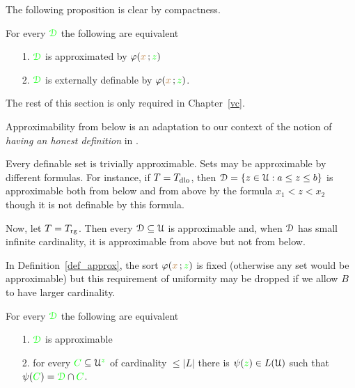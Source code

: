 The following proposition is clear by compactness.

\begin{proposition}\label{prop_approx=external}
   For every ${\color{green}\EuScript D}$ the following are equivalent
   \begin{itemize}
   \item[1.] ${\color{green}\EuScript D}$ is approximated by $\varphi({\color{brown} x}\,;{\color{green} z})$
   \item[2.] ${\color{green}\EuScript D}$ is externally definable by $\varphi({\color{brown} x}\,;{\color{green} z})$.
   \end{itemize}
\end{proposition}

The rest of this section is only required in Chapter~\ref{vc}.

Approximability from below is an adaptation to our context of the notion of \textit{having an honest definition} in \cite{CS}.

\begin{example}
Every definable set is trivially approximable.
Sets may be approximable by different formulas.
For instance, if $T=T_{\rm dlo}$, then $\EuScript D=\{z\in\EuScript U:a\le z\le b\}$ is approximable both from below and from above by the formula $x_1<z<x_2$ though it is not definable by this formula.

Now, let $T=T_{\rm rg}$.
Then every $\EuScript D\subseteq\EuScript U$ is approximable and, when $\EuScript D$ has small infinite cardinality, it is approximable from above but not from below.
\end{example}

In Definition~\ref{def_approx}, the sort $\varphi({\color{brown} x}\,;{\color{green} z})$ is fixed (otherwise any set would be approximable) but this requirement of uniformity may be dropped if we allow $B$ to have larger cardinality.

\begin{proposition}\label{lem_approx_nonunif}
For every ${\color{green}\EuScript D}$ the following are equivalent
\begin{itemize}
\item[1.] ${\color{green}\EuScript D}$ is approximable
\item[2.] for every ${\color{green} C}\subseteq\EuScript U^{\color{green} z}$ of cardinality $\le|L|$ there is $\psi({\color{green} z})\in L(\EuScript U)$ such that $\psi({\color{green} C})={\color{green}\EuScript D}\cap{\color{green}C}$.
\end{itemize}
\end{proposition}

